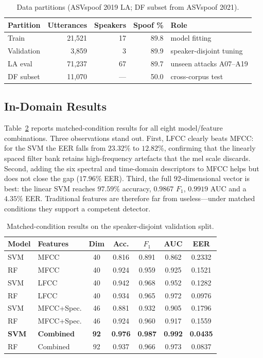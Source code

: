 \documentclass[journal,10pt]{IEEEtran}
\begin{document}
\begin{table}[!t]
\caption{Data partitions (ASVspoof 2019 LA; DF subset from ASVspoof 2021).}
\label{tab:data}
\centering
\footnotesize
\begin{tabular}{lrrrl}
\toprule
Partition & Utterances & Speakers & Spoof \% & Role \\
\midrule
Train      & 21{,}521 & 17 & 89.8 & model fitting \\
Validation &  3{,}859 &  3 & 89.9 & speaker-disjoint tuning \\
LA eval    & 71{,}237 & 67 & 89.7 & unseen attacks A07--A19 \\
DF subset  & 11{,}070 & --- & 50.0 & cross-corpus test \\
\bottomrule
\end{tabular}
\end{table}

\subsection{In-Domain Results}
Table~\ref{tab:val} reports matched-condition results for all eight
model/feature combinations. Three observations stand out. First, LFCC
clearly beats MFCC: for the SVM the EER falls from $23.32\%$ to $12.82\%$,
confirming that the linearly spaced filter bank retains high-frequency
artefacts that the mel scale discards. Second, adding the six spectral and
time-domain descriptors to MFCC helps but does not close the gap
($17.96\%$ EER). Third, the full $92$-dimensional vector is best: the linear
SVM reaches $97.59\%$ accuracy, $0.9867$ $F_1$, $0.9919$ AUC and a $4.35\%$
EER. Traditional features are therefore far from useless---under matched
conditions they support a competent detector.

\begin{table}[!t]
\caption{Matched-condition results on the speaker-disjoint validation split.}
\label{tab:val}
\centering
\footnotesize
\begin{tabular}{llccccc}
\toprule
Model & Features & Dim & Acc. & $F_1$ & AUC & EER \\
\midrule
SVM & MFCC       & 40 & 0.816 & 0.891 & 0.862 & 0.2332 \\
RF  & MFCC       & 40 & 0.924 & 0.959 & 0.925 & 0.1521 \\
SVM & LFCC       & 40 & 0.942 & 0.968 & 0.952 & 0.1282 \\
RF  & LFCC       & 40 & 0.934 & 0.965 & 0.972 & 0.0976 \\
SVM & MFCC+Spec. & 46 & 0.881 & 0.932 & 0.905 & 0.1796 \\
RF  & MFCC+Spec. & 46 & 0.924 & 0.960 & 0.917 & 0.1559 \\
\textbf{SVM} & \textbf{Combined} & \textbf{92} & \textbf{0.976}
      & \textbf{0.987} & \textbf{0.992} & \textbf{0.0435} \\
RF  & Combined   & 92 & 0.937 & 0.966 & 0.973 & 0.0837 \\
\bottomrule
\end{tabular}
\end{table}
\end{document}
